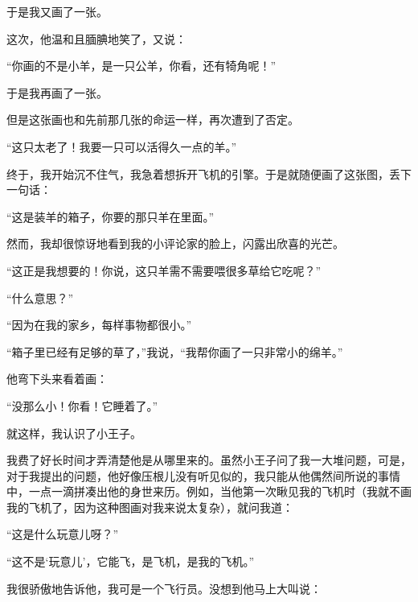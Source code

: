 于是我又画了一张。

这次，他温和且腼腆地笑了，又说：

“你画的不是小羊，是一只公羊，你看，还有犄角呢！”

于是我再画了一张。

{\startalignment[center]
 \stopalignment}

但是这张画也和先前那几张的命运一样，再次遭到了否定。

“这只太老了！我要一只可以活得久一点的羊。”

终于，我开始沉不住气，我急着想拆开飞机的引擎。于是就随便画了这张图，丢下一句话：

{\startalignment[center]
 \stopalignment}

“这是装羊的箱子，你要的那只羊在里面。”

然而，我却很惊讶地看到我的小评论家的脸上，闪露出欣喜的光芒。

{\startalignment[center]
 \stopalignment}

“这正是我想要的！你说，这只羊需不需要喂很多草给它吃呢？”

“什么意思？”

“因为在我的家乡，每样事物都很小。”

“箱子里已经有足够的草了，”我说，“我帮你画了一只非常小的绵羊。”

他弯下头来看着画：

“没那么小！你看！它睡着了。”

就这样，我认识了小王子。


\stoptitle

\starttitle[title={3}]

我费了好长时间才弄清楚他是从哪里来的。虽然小王子问了我一大堆问题，可是，对于我提出的问题，他好像压根儿没有听见似的，我只能从他偶然间所说的事情中，一点一滴拼凑出他的身世来历。例如，当他第一次瞅见我的飞机时（我就不画我的飞机了，因为这种图画对我来说太复杂），就问我道：

“这是什么玩意儿呀？”

“这不是‘玩意儿'，它能飞，是飞机，是我的飞机。”

我很骄傲地告诉他，我可是一个飞行员。没想到他马上大叫说：

